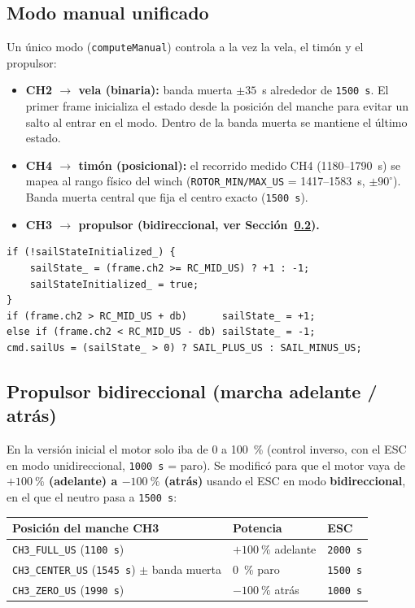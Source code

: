 \documentclass[12pt,a4paper]{article}
\newcommand{\us}[1]{\texttt{#1\,\textmu s}}
\begin{document}
\subsection{Modo manual unificado}

Un \'unico modo (\texttt{computeManual}) controla a la vez la vela, el tim\'on y el
propulsor:

\begin{itemize}
  \item \textbf{CH2 $\to$ vela (binaria):} banda muerta $\pm35$~\textmu s alrededor
    de \us{1500}. El primer frame inicializa el estado desde la posici\'on del
    manche para evitar un salto al entrar en el modo. Dentro de la banda muerta se
    mantiene el \'ultimo estado.
  \item \textbf{CH4 $\to$ tim\'on (posicional):} el recorrido medido CH4
    (1180--1790~\textmu s) se mapea al rango f\'isico del winch
    (\texttt{ROTOR\_MIN/MAX\_US} = 1417--1583~\textmu s, $\pm90^{\circ}$). Banda muerta
    central que fija el centro exacto (\us{1500}).
  \item \textbf{CH3 $\to$ propulsor (bidireccional, ver Secci\'on~\ref{sec:bidir}).}
\end{itemize}

\begin{lstlisting}[style=cpp, caption={ManualController -- logica de vela binaria con estado memorizado}]
if (!sailStateInitialized_) {
    sailState_ = (frame.ch2 >= RC_MID_US) ? +1 : -1;
    sailStateInitialized_ = true;
}
if (frame.ch2 > RC_MID_US + db)      sailState_ = +1;
else if (frame.ch2 < RC_MID_US - db) sailState_ = -1;
cmd.sailUs = (sailState_ > 0) ? SAIL_PLUS_US : SAIL_MINUS_US;
\end{lstlisting}

\subsection{Propulsor bidireccional (marcha adelante / atr\'as)}
\label{sec:bidir}

En la versi\'on inicial el motor solo iba de 0 a 100~\% (control inverso, con el
ESC en modo unidireccional, \us{1000} = paro). Se modific\'o para que el motor vaya
de \textbf{$+100~\%$ (adelante) a $-100~\%$ (atr\'as)} usando el ESC en modo
\textbf{bidireccional}, en el que el neutro pasa a \us{1500}:

\begin{longtable}{C{4.5cm} C{3cm} L{5cm}}
  \toprule
  \textcolor{tableheadfg}{\textbf{Posici\'on del manche CH3}} &
  \textcolor{tableheadfg}{\textbf{Potencia}} &
  \textcolor{tableheadfg}{\textbf{ESC}} \\
  \midrule
  \endhead
  \bottomrule
  \endfoot
  \texttt{CH3\_FULL\_US} (\us{1100}) & $+100~\%$ adelante & \us{2000} \\[3pt]
  \texttt{CH3\_CENTER\_US} (\us{1545}) $\pm$ banda muerta & 0~\% paro & \us{1500} \\[3pt]
  \texttt{CH3\_ZERO\_US} (\us{1990}) & $-100~\%$ atr\'as & \us{1000} \\
\end{longtable}
\end{document}
